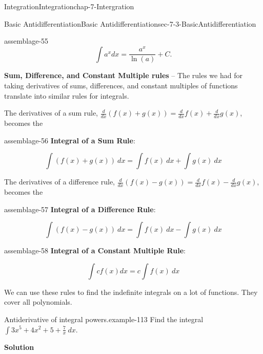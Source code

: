 \documentclass[oneside,10pt,]{book}
\newcommand{\terminology}[1]{\textbf{#1}}
\numberwithin{equation}{section}
\begin{document}
\begin{chapterptx}{Integration}{}{Integration}{}{}{chap-7-Intergration}
\begin{sectionptx}{Basic Antidifferentiation}{}{Basic Antidifferentiation}{}{}{sec-7-3-BasicAntidifferentiation}
\begin{assemblage}{}{assemblage-55}%
\hypertarget{p-2733}{}%
%
\begin{equation*}
\int a^x  dx=\frac{a^x}{\ln (a)} +C.
\end{equation*}
%
\end{assemblage}
\hypertarget{p-2734}{}%
\terminology{Sum, Difference, and Constant Multiple rules} – The rules we had for taking derivatives of sums, differences, and constant multiples of functions translate into similar rules for integrals.%
\par
\hypertarget{p-2735}{}%
The derivatives of a sum rule, \(\frac{d}{dx}(f(x)+g(x))=\frac{d}{dx}f(x)+\frac{d}{dx}g(x)\), becomes the%
\begin{assemblage}{}{assemblage-56}%
\hypertarget{p-2736}{}%
\terminology{Integral of a Sum Rule}:%
\par
\hypertarget{p-2737}{}%
%
\begin{equation*}
\int (f(x)+g(x))\ dx=\int f(x)\ dx+\int g(x)\ dx
\end{equation*}
%
\end{assemblage}
\hypertarget{p-2738}{}%
The derivatives of a difference rule, \(\frac{d}{dx}(f(x)-g(x))=\frac{d}{dx}f(x)-\frac{d}{dx}g(x)\), becomes the%
\begin{assemblage}{}{assemblage-57}%
\hypertarget{p-2739}{}%
\terminology{Integral of a Difference Rule}:%
\par
\hypertarget{p-2740}{}%
%
\begin{equation*}
\int (f(x)-g(x))\ dx=\int f(x)\ dx-\int g(x)\ dx
\end{equation*}
%
\end{assemblage}
\begin{assemblage}{}{assemblage-58}%
\hypertarget{p-2741}{}%
\terminology{Integral of a Constant Multiple Rule}:%
\par
\hypertarget{p-2742}{}%
%
\begin{equation*}
\int cf(x) dx=c\int f(x)\ dx
\end{equation*}
%
\end{assemblage}
\hypertarget{p-2743}{}%
We can use these rules to find the indefinite integrals on a lot of functions.  They cover all polynomials.%
\begin{example}{Antiderivative of integral powers.}{example-113}%
\hypertarget{p-2744}{}%
Find the integral \(\int 3x^5+4x^2+5+\frac{7}{x}\ dx\).%
\par
\hypertarget{p-2745}{}%
\terminology{Solution}%
%
\begin{equation*}

\end{equation*}
\end{example}
\end{sectionptx}
\end{chapterptx}
\end{document}
